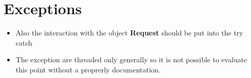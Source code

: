 \section{Exceptions}
\begin{itemize}
    \begin{itemize}
      \item Also the interaction with the object \textbf{Request} should be put into the try catch
    \end{itemize}
    \begin{itemize}
      \item The exception are threaded only generally so it is not possible to evaluate this point without a proprerly
      documentation.
    \end{itemize}
\end{itemize}
